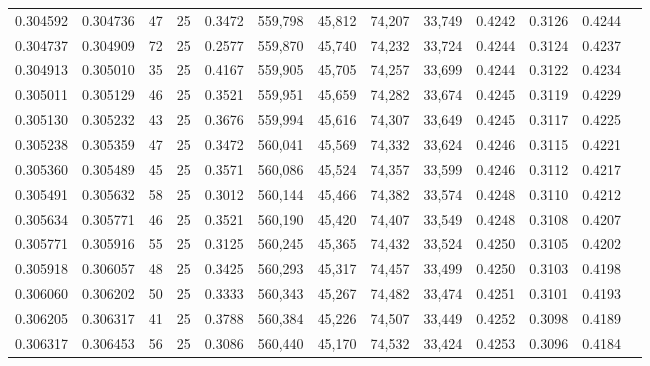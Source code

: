 \begin{tabular}{rrrrrrrrrrrrr}
0.304592 & 0.304736 &    47 &  25 &                                     0.3472 & 559,798 &  45,812 &  74,207 &  33,749 & 0.4242 & 0.3126 & 0.4244 \\
0.304737 & 0.304909 &    72 &  25 &                                     0.2577 & 559,870 &  45,740 &  74,232 &  33,724 & 0.4244 & 0.3124 & 0.4237 \\
0.304913 & 0.305010 &    35 &  25 &                                     0.4167 & 559,905 &  45,705 &  74,257 &  33,699 & 0.4244 & 0.3122 & 0.4234 \\
0.305011 & 0.305129 &    46 &  25 &                                     0.3521 & 559,951 &  45,659 &  74,282 &  33,674 & 0.4245 & 0.3119 & 0.4229 \\
0.305130 & 0.305232 &    43 &  25 &                                     0.3676 & 559,994 &  45,616 &  74,307 &  33,649 & 0.4245 & 0.3117 & 0.4225 \\
0.305238 & 0.305359 &    47 &  25 &                                     0.3472 & 560,041 &  45,569 &  74,332 &  33,624 & 0.4246 & 0.3115 & 0.4221 \\
0.305360 & 0.305489 &    45 &  25 &                                     0.3571 & 560,086 &  45,524 &  74,357 &  33,599 & 0.4246 & 0.3112 & 0.4217 \\
0.305491 & 0.305632 &    58 &  25 &                                     0.3012 & 560,144 &  45,466 &  74,382 &  33,574 & 0.4248 & 0.3110 & 0.4212 \\
0.305634 & 0.305771 &    46 &  25 &                                     0.3521 & 560,190 &  45,420 &  74,407 &  33,549 & 0.4248 & 0.3108 & 0.4207 \\
0.305771 & 0.305916 &    55 &  25 &                                     0.3125 & 560,245 &  45,365 &  74,432 &  33,524 & 0.4250 & 0.3105 & 0.4202 \\
0.305918 & 0.306057 &    48 &  25 &                                     0.3425 & 560,293 &  45,317 &  74,457 &  33,499 & 0.4250 & 0.3103 & 0.4198 \\
0.306060 & 0.306202 &    50 &  25 &                                     0.3333 & 560,343 &  45,267 &  74,482 &  33,474 & 0.4251 & 0.3101 & 0.4193 \\
0.306205 & 0.306317 &    41 &  25 &                                     0.3788 & 560,384 &  45,226 &  74,507 &  33,449 & 0.4252 & 0.3098 & 0.4189 \\
0.306317 & 0.306453 &    56 &  25 &                                     0.3086 & 560,440 &  45,170 &  74,532 &  33,424 & 0.4253 & 0.3096 & 0.4184 \\

\end{tabular}
